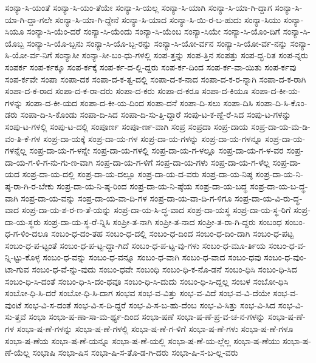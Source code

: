{ಸಂನ್ಯಾ-ಸಿ-ಯಂತೆ
ಸಂನ್ಯಾ-ಸಿ-ಯಂ-ತೆಯೇ
ಸಂನ್ಯಾ-ಸಿ-ಯಲ್ಲ
ಸಂನ್ಯಾ-ಸಿ-ಯಾಗಿ
ಸಂನ್ಯಾ-ಸಿ-ಯಾ-ಗಿ-ದ್ದಾಗ
ಸಂನ್ಯಾ-ಸಿ-ಯಾ-ಗಿ-ದ್ದಾ-ಗಲೇ
ಸಂನ್ಯಾ-ಸಿ-ಯಾ-ಗಿ-ದ್ದೇನೆ
ಸಂನ್ಯಾ-ಸಿ-ಯಾದ
ಸಂನ್ಯಾ-ಸಿ-ಯಿ-ರ-ಬ-ಹುದು
ಸಂನ್ಯಾ-ಸಿಯು
ಸಂನ್ಯಾ-ಸಿಯೂ
ಸಂನ್ಯಾ-ಸಿ-ಯೆಂ-ದರೆ
ಸಂನ್ಯಾ-ಸಿ-ಯೆಂದು
ಸಂನ್ಯಾ-ಸಿ-ಯೆಂಬ
ಸಂನ್ಯಾ-ಸಿಯೇ
ಸಂನ್ಯಾ-ಸಿ-ಯೊಂ-ದಿಗೆ
ಸಂನ್ಯಾ-ಸಿ-ಯೊಬ್ಬ
ಸಂನ್ಯಾ-ಸಿ-ಯೊ-ಬ್ಬನು
ಸಂನ್ಯಾ-ಸಿ-ಯೊ-ಬ್ಬ-ರನ್ನು
ಸಂನ್ಯಾ-ಸಿ-ಯೋ-ರ್ವನ
ಸಂನ್ಯಾ-ಸಿ-ಯೋ-ರ್ವ-ನನ್ನು
ಸಂನ್ಯಾ-ಸಿ-ಯೋ-ರ್ವ-ನಿಗೆ
ಸಂನ್ಯಾಸೀ
ಸಂನ್ಯಾ-ಸೀ-ಬಂ-ಧು-ಗಳಲ್ಲಿ
ಸಂಪ-ತ್ತನ್ನು
ಸಂಪ-ತ್ತಿನ
ಸಂಪತ್ತು
ಸಂಪ-ದ್ಭ-ರಿತ
ಸಂಪ-ನ್ನರು
ಸಂಪರ್ಕ
ಸಂಪ-ರ್ಕಕ್ಕೂ
ಸಂಪ-ರ್ಕಕ್ಕೆ
ಸಂಪ-ರ್ಕ-ದ-ಲ್ಲಿ-ದ್ದರು
ಸಂಪ-ರ್ಕ-ದಿಂದ
ಸಂಪ-ರ್ಕ-ವಾ-ಯಿತು
ಸಂಪ-ರ್ಕವು
ಸಂಪ-ರ್ಕವೇ
ಸಂಪಾ
ಸಂಪಾ-ದಕ
ಸಂಪಾ-ದ-ಕ-ತ್ವ-ದಲ್ಲಿ
ಸಂಪಾ-ದ-ಕ-ನಾದ
ಸಂಪಾ-ದ-ಕ-ರ-ನ್ನಾಗಿ
ಸಂಪಾ-ದ-ಕ-ರಾಗಿ
ಸಂಪಾ-ದ-ಕ-ರಾದ
ಸಂಪಾ-ದ-ಕ-ರಾ-ದರು
ಸಂಪಾ-ದ-ಕರು
ಸಂಪಾ-ದ-ಕರೂ
ಸಂಪಾ-ದ-ಕಿಯೂ
ಸಂಪಾ-ದ-ಕೀ-ಯ-ಗಳನ್ನು
ಸಂಪಾ-ದ-ಕೀ-ಯದ
ಸಂಪಾ-ದ-ಕೀ-ಯ-ದಿಂದ
ಸಂಪಾ-ದನೆ
ಸಂಪಾ-ದಿ-ಸಲು
ಸಂಪಾ-ದಿಸಿ
ಸಂಪಾ-ದಿ-ಸಿ-ಕೊಂ-ಡರು
ಸಂಪಾ-ದಿ-ಸಿ-ಕೊಂಡು
ಸಂಪಾ-ದಿ-ಸಿದ
ಸಂಪಾ-ದಿ-ಸು-ತ್ತಿ-ದ್ದಾರೆ
ಸಂಪು-ಟ-ಕ-ಣ್ದೆ-ರೆ-ಸಿದ
ಸಂಪು-ಟ-ಗಳನ್ನು
ಸಂಪು-ಟ-ಗಳಲ್ಲಿ
ಸಂಪು-ಟ-ದಲ್ಲಿ
ಸಂಪೂರ್ಣ
ಸಂಪೂ-ರ್ಣ-ವಾಗಿ
ಸಂಪ್ರ
ಸಂಪ್ರದಾ
ಸಂಪ್ರ-ದಾಯ
ಸಂಪ್ರ-ದಾ-ಯ-ಮ-ಡಿ-ವಂ-ತಿ-ಕೆ-ಗಳ
ಸಂಪ್ರ-ದಾ-ಯಕ್ಕೆ
ಸಂಪ್ರ-ದಾ-ಯ-ಗಳ
ಸಂಪ್ರ-ದಾ-ಯ-ಗಳನ್ನು
ಸಂಪ್ರ-ದಾ-ಯ-ಗಳನ್ನೂ
ಸಂಪ್ರ-ದಾ-ಯ-ಗಳನ್ನೆಲ್ಲ
ಸಂಪ್ರ-ದಾ-ಯ-ಗ-ಳನ್ನೇ
ಸಂಪ್ರ-ದಾ-ಯ-ಗಳಲ್ಲಿ
ಸಂಪ್ರ-ದಾ-ಯ-ಗ-ಳಲ್ಲೂ
ಸಂಪ್ರ-ದಾ-ಯ-ಗ-ಳ-ವರ
ಸಂಪ್ರ-ದಾ-ಯ-ಗ-ಳಿ-ಗ-ನು-ಗು-ಣ-ವಾಗಿ
ಸಂಪ್ರ-ದಾ-ಯ-ಗ-ಳಿಗೆ
ಸಂಪ್ರ-ದಾ-ಯ-ಗಳು
ಸಂಪ್ರ-ದಾ-ಯ-ಗ-ಳೆಲ್ಲ
ಸಂಪ್ರ-ದಾ-ಯದ
ಸಂಪ್ರ-ದಾ-ಯ-ದಲ್ಲಿ
ಸಂಪ್ರ-ದಾ-ಯ-ದಲ್ಲೂ
ಸಂಪ್ರ-ದಾ-ಯ-ದ-ವರು
ಸಂಪ್ರ-ದಾ-ಯ-ನಿಷ್ಠ
ಸಂಪ್ರ-ದಾ-ಯ-ನಿ-ಷ್ಠ-ರಾ-ಗಿ-ರ-ಬೇಕು
ಸಂಪ್ರ-ದಾ-ಯ-ನಿ-ಷ್ಠ-ರಿಂದ
ಸಂಪ್ರ-ದಾ-ಯ-ನಿ-ಷ್ಠೆಯ
ಸಂಪ್ರ-ದಾ-ಯ-ಬದ್ಧ
ಸಂಪ್ರ-ದಾ-ಯ-ಬ-ದ್ಧ-ವಾಗಿ
ಸಂಪ್ರ-ದಾ-ಯ-ವನ್ನು
ಸಂಪ್ರ-ದಾ-ಯ-ವಾ-ದಿ-ಗಳ
ಸಂಪ್ರ-ದಾ-ಯ-ವಾ-ದಿ-ಗ-ಳಿಗೂ
ಸಂಪ್ರ-ದಾ-ಯ-ವಿ-ರು-ದ್ಧ-ವಾದ
ಸಂಪ್ರ-ದಾ-ಯ-ಶ-ರ-ಣ-ತೆ-ಯನ್ನು
ಸಂಪ್ರ-ದಾ-ಯ-ಸಿ-ದ್ಧ-ವಾದ
ಸಂಪ್ರ-ದಾ-ಯಸ್ಥ
ಸಂಪ್ರ-ದಾ-ಯ-ಸ್ಥ-ರಿಗೆ
ಸಂಪ್ರ-ದಾ-ಯ-ಸ್ಥರು
ಸಂಪ್ರ-ದಾ-ಯ-ಸ್ಥ-ರೆ-ನ್ನಿಸಿ
ಸಂಪ್ರೀ-ತ-ನಾಗಿ
ಸಂಪ್ರೀ-ತ-ನಾದ
ಸಂಪ್ರೀ-ತ-ರಾ-ಗಿ-ದ್ದರು
ಸಂಬಂಧ
ಸಂಬಂ-ಧ-ಗ-ಳಿಂ-ದಲೂ
ಸಂಬಂ-ಧ-ದಂ-ತಹ
ಸಂಬಂ-ಧ-ದಲ್ಲಿ
ಸಂಬಂ-ಧ-ದಿಂದ
ಸಂಬಂ-ಧ-ದಿಂ-ದಾಗಿ
ಸಂಬಂ-ಧ-ಪಟ್ಟ
ಸಂಬಂ-ಧ-ಪ-ಟ್ಟಂತೆ
ಸಂಬಂ-ಧ-ಪ-ಟ್ಟ-ದ್ದಾ-ಗಿದೆ
ಸಂಬಂ-ಧ-ಪ-ಟ್ಟ-ವು-ಗಳು
ಸಂಬಂ-ಧ-ಮೂ-ರ್ತಿಯ
ಸಂಬಂ-ಧ-ವ-ನ್ನಿ-ಟ್ಟು-ಕೊಳ್ಳ
ಸಂಬಂ-ಧ-ವನ್ನು
ಸಂಬಂ-ಧ-ವನ್ನೂ
ಸಂಬಂ-ಧ-ವಾಗಿ
ಸಂಬಂ-ಧ-ವಾದ
ಸಂಬಂ-ಧವು
ಸಂಬಂ-ಧ-ವುಂ-ಟಾ-ಗುವ
ಸಂಬಂ-ಧ-ವೆ-ನ್ನು-ವುದು
ಸಂಬಂ-ಧವೇ
ಸಂಬಂಧಿ
ಸಂಬಂ-ಧಿ-ಕ-ನೊ-ಡನೆ
ಸಂಬಂ-ಧಿಸಿ
ಸಂಬಂ-ಧಿ-ಸಿದ
ಸಂಬಂ-ಧಿ-ಸಿ-ದಂತೆ
ಸಂಬಂ-ಧಿ-ಸಿ-ದಂ-ಥವೂ
ಸಂಬಂ-ಧಿ-ಸಿ-ದುದು
ಸಂಬಂ-ಧಿ-ಸಿ-ದ್ದಲ್ಲ
ಸಂಬಳ
ಸಂಬೋ-ಧಿಸಿ
ಸಂಬೋ-ಧಿ-ಸಿ-ದರೆ
ಸಂಬೋ-ಧಿ-ಸಿ-ದಾಗ
ಸಂಭವ
ಸಂಭ-ವ-ವಿತ್ತು
ಸಂಭ-ವ-ವಿದೆ
ಸಂಭ-ವ-ವಿ-ದೆಯೇ
ಸಂಭ-ವ-ವುಂಟೆ
ಸಂಭ-ವಿ-ಸ-ದಂತೆ
ಸಂಭ-ವಿ-ಸ-ದಿ-ದ್ದರೆ
ಸಂಭ-ವಿ-ಸ-ಬ-ಹು-ದೆಂಬ
ಸಂಭ-ವಿ-ಸಿತ್ತು
ಸಂಭ-ವಿ-ಸಿದ
ಸಂಭ-ವಿ-ಸು-ತ್ತವೆ
ಸಂಭಾ
ಸಂಭಾ-ಷ-ಣಾ-ಸಾ-ಮ-ರ್ಥ್ಯ-ದಿಂದ
ಸಂಭಾ-ಷಣೆ
ಸಂಭಾ-ಷ-ಣೆ-ಪ್ರ-ವ-ಚ-ನ-ಗಳನ್ನು
ಸಂಭಾ-ಷ-ಣೆ-ಗಳ
ಸಂಭಾ-ಷ-ಣೆ-ಗಳನ್ನು
ಸಂಭಾ-ಷ-ಣೆ-ಗಳಲ್ಲಿ
ಸಂಭಾ-ಷ-ಣೆ-ಗ-ಳಿಗೆ
ಸಂಭಾ-ಷ-ಣೆ-ಗಳು
ಸಂಭಾ-ಷ-ಣೆ-ಗಳೂ
ಸಂಭಾ-ಷ-ಣೆಯ
ಸಂಭಾ-ಷ-ಣೆ-ಯನ್ನೂ
ಸಂಭಾ-ಷ-ಣೆ-ಯಲ್ಲಿ
ಸಂಭಾ-ಷ-ಣೆ-ಯ-ಲ್ಲೆಲ್ಲ
ಸಂಭಾ-ಷ-ಣೆಯು
ಸಂಭಾ-ಷ-ಣೆ-ಯೆಲ್ಲ
ಸಂಭಾಷಿ
ಸಂಭಾ-ಷಿಸ
ಸಂಭಾ-ಷಿ-ಸ-ತೊ-ಡ-ಗಿ-ದರು
ಸಂಭಾ-ಷಿ-ಸ-ಬ-ಲ್ಲ-ವರು
}

